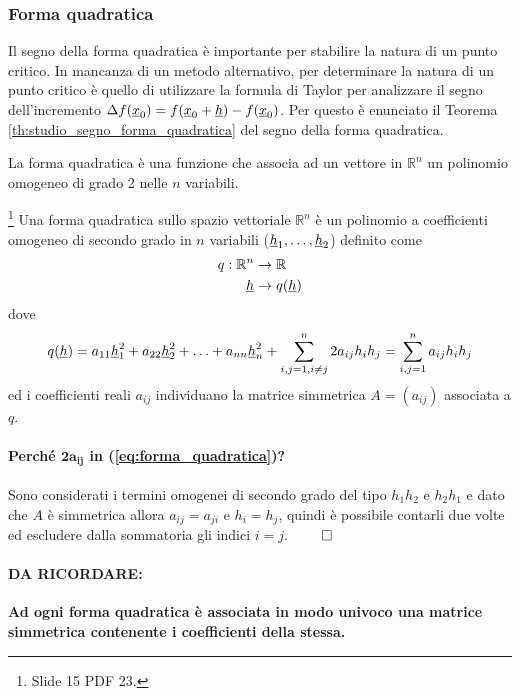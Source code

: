 \subsubsection{Forma quadratica}
Il segno della forma quadratica è importante per stabilire la natura di un punto critico. In mancanza di un metodo alternativo, per determinare la natura di un punto critico è quello di utilizzare la formula di Taylor per analizzare il segno dell'incremento $\Delta f(\uline x_0) = f(\uline x_0 + \uline h) - f(\uline x_0)$. Per questo è enunciato il Teorema \ref{th:studio_segno_forma_quadratica} del segno della forma quadratica.

La forma quadratica è una funzione che associa ad un vettore in $\mathbb{R}^n$ un polinomio omogeneo di grado 2 nelle $n$ variabili.

\begin{definition}\footnote{Slide 15 PDF 23.}
	Una forma quadratica sullo spazio vettoriale $\mathbb{R}^n$ è un polinomio a coefficienti omogeneo di secondo grado in $n$ variabili ($\uline h_1,\hdots, \uline h_2$) definito come
	\begin{equation}\label{eq:forma_quadratica}
		\begin{aligned}
			q:\mathbb{R}^n&\rightarrow\mathbb{R}\\
			\uline h &\rightarrow q(\uline h)
		\end{aligned}
	\end{equation}
	dove
	\begin{equation*}
		q (\uline h) = a_{11}\uline h_1^2 + a_{22}\uline h_2^2 + \hdots + a_{nn}\uline h_n^2 + \sum_{i,j=1, i\neq j}^{n} 2a_{ij} h_ih_j = \sum_{i,j=1}^{n} a_{ij}h_i h_j
	\end{equation*}
	ed i coefficienti reali $a_{ij}$ individuano la matrice simmetrica $A=(a_{ij})$ associata a $q$.
\end{definition}

\paragraph{Perché $\boldsymbol{2a_{ij}}$ in (\ref{eq:forma_quadratica})?} Sono considerati i termini omogenei di secondo grado del tipo $h_1h_2$ e $h_2h_1$ e dato che $A$ è simmetrica allora $a_{ij} = a_{ji}$ e $h_i = h_j$, quindi è possibile contarli due volte ed escludere dalla sommatoria gli indici $i=j$. $\qed$

\paragraph{DA RICORDARE:} \textbf{Ad ogni forma quadratica è associata in modo univoco una matrice simmetrica contenente i coefficienti della stessa.}

